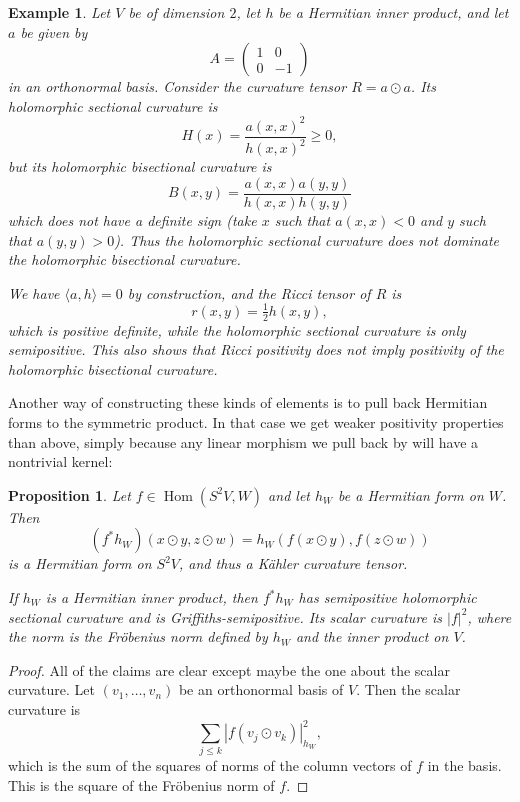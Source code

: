 \documentclass[10pt,a4paper]{article}
\newtheorem{prop}[theo]{Proposition}
\newtheorem{exam}[theo]{Example}
\newtheorem*{proof}{Proof}
\DeclareMathOperator{\Hom}{Hom}
\begin{document}
\begin{exam}
\label{exam:not-griffiths-positive}
Let $V$ be of dimension $2$, let $h$ be a Hermitian inner product, and let $a$ be given by
$$
A = \begin{pmatrix} 1 & 0 \\ 0 & -1 \end{pmatrix}
$$
in an orthonormal basis. Consider the curvature tensor $R = a \odot a$. Its holomorphic sectional curvature is
$$
H(x) = \frac{a(x,x)^2}{h(x,x)^2} \geq 0,
$$
but its holomorphic bisectional curvature is
$$
B(x,y) = \frac{a(x,x)a(y,y)}{h(x,x)h(y,y)}
$$
which does not have a definite sign (take $x$ such that $a(x,x) < 0$ and $y$ such that $a(y,y) > 0$). Thus the holomorphic sectional curvature does not dominate the holomorphic bisectional curvature.

We have $\langle a, h \rangle = 0$ by construction, and the Ricci tensor of $R$ is
$$
r(x,y) = \tfrac12 h(x, y),
$$
which is positive definite, while the holomorphic sectional curvature is only semipositive. This also shows that Ricci positivity does not imply positivity of the holomorphic bisectional curvature.
\end{exam}


Another way of constructing these kinds of elements is to pull back Hermitian forms to the symmetric product. In that case we get weaker positivity properties than above, simply because any linear morphism we pull back by will have a nontrivial kernel:

\begin{prop}
\label{prop:algebraic-curvature-second-fundamental}
Let $f \in \Hom(S^2V, W)$ and let $h_W$ be a Hermitian form on $W$. Then
$$
(f^*h_W)(x \odot y, z \odot w)
= h_W(f(x \odot y), f(z \odot w))
$$
is a Hermitian form on $S^2V$, and thus a K\"ahler curvature tensor.

If $h_W$ is a Hermitian inner product, then $f^*h_W$ has semipositive holomorphic sectional curvature and is Griffiths-semipositive. Its scalar curvature is $|f|^2$, where the norm is the Fr\"obenius norm defined by $h_W$ and the inner product on $V$.
\end{prop}

\begin{proof}
All of the claims are clear except maybe the one about the scalar curvature. Let $(v_1, \ldots, v_n)$ be an orthonormal basis of $V$. Then the scalar curvature is
\[
\sum_{j \leq k} |f(v_j \odot v_k)|^2_{h_W},
\]
which is the sum of the squares of norms of the column vectors of $f$ in the basis. This is the square of the Fr\"obenius norm of $f$.
\end{proof}
\end{document}
